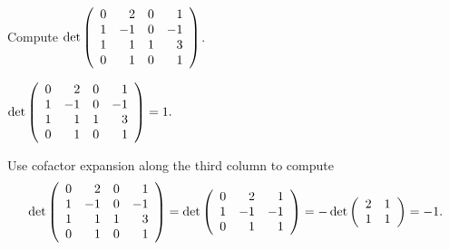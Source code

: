 \documentclass{ximera}
\author{Matthew Carr}
\begin{document}

\begin{exercise}\label{mc7_1A}

Compute \quad $\det\left(\begin{array}{rrrrrrrrrrrrrrrrrr} 0 & 2 & 0 & 1\\ 1 & -1 & 0 & -1\\ 1 & 1 & 1& 3\\ 0 & 1 & 0 & 1 \end{array}\right)$.
  
\begin{solution}

\ans $\det\left(\begin{array}{rrrrrrrrrrrrrrrrrr} 0 & 2 & 0 & 1\\ 1 & -1 & 0 & -1\\ 1 & 1 & 1& 3\\ 0 & 1 & 0 & 1 \end{array}\right)=1\ldotp$

\soln Use cofactor expansion along the third column to compute
\[
\det\left(\begin{array}{rrrrrrrrrrrrrrrrrr} 0 & 2 & 0 & 1\\ 1 & -1 & 0 & -1\\ 1 & 1 & 1& 3\\ 0 & 1 & 0 & 1 \end{array}\right) = 
\det\left(\begin{array}{rrrrrrrrrrrrrrrrrr} 0 & 2 & 1\\ 1 & -1 &  -1\\  0& 1 & 1 \end{array}\right) = -\det\left(\begin{array}{rrrrrrrrrrrrrrrrrr} 2 & 1\\ 1 & 1 \end{array}\right) = -1\ldotp
\]
\end{solution}
\end{exercise}
\end{document}
